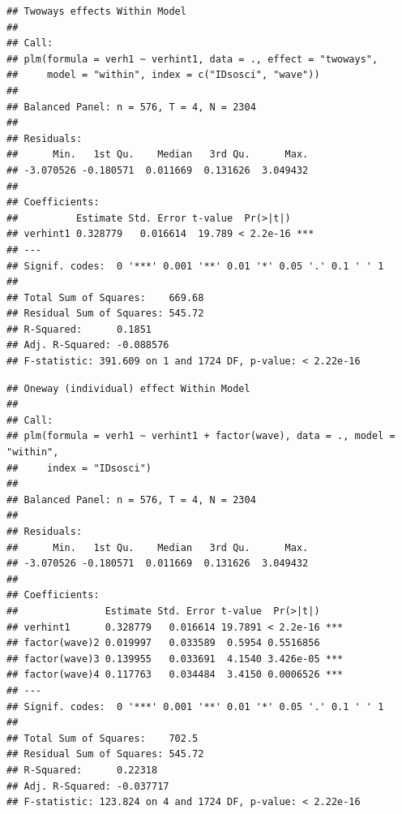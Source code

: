 \documentclass[
]{book}
\newenvironment{Shaded}{\begin{snugshade}}{\end{snugshade}}
\newcommand{\DataTypeTok}[1]{\textcolor[rgb]{0.13,0.29,0.53}{#1}}
\newcommand{\KeywordTok}[1]{\textcolor[rgb]{0.13,0.29,0.53}{\textbf{#1}}}
\newcommand{\NormalTok}[1]{#1}
\newcommand{\OperatorTok}[1]{\textcolor[rgb]{0.81,0.36,0.00}{\textbf{#1}}}
\newcommand{\StringTok}[1]{\textcolor[rgb]{0.31,0.60,0.02}{#1}}
\begin{document}
\begin{verbatim}
## Twoways effects Within Model
## 
## Call:
## plm(formula = verh1 ~ verhint1, data = ., effect = "twoways", 
##     model = "within", index = c("IDsosci", "wave"))
## 
## Balanced Panel: n = 576, T = 4, N = 2304
## 
## Residuals:
##      Min.   1st Qu.    Median   3rd Qu.      Max. 
## -3.070526 -0.180571  0.011669  0.131626  3.049432 
## 
## Coefficients:
##          Estimate Std. Error t-value  Pr(>|t|)    
## verhint1 0.328779   0.016614  19.789 < 2.2e-16 ***
## ---
## Signif. codes:  0 '***' 0.001 '**' 0.01 '*' 0.05 '.' 0.1 ' ' 1
## 
## Total Sum of Squares:    669.68
## Residual Sum of Squares: 545.72
## R-Squared:      0.1851
## Adj. R-Squared: -0.088576
## F-statistic: 391.609 on 1 and 1724 DF, p-value: < 2.22e-16
\end{verbatim}

\begin{Shaded}
\end{Shaded}

\begin{verbatim}
## Oneway (individual) effect Within Model
## 
## Call:
## plm(formula = verh1 ~ verhint1 + factor(wave), data = ., model = "within", 
##     index = "IDsosci")
## 
## Balanced Panel: n = 576, T = 4, N = 2304
## 
## Residuals:
##      Min.   1st Qu.    Median   3rd Qu.      Max. 
## -3.070526 -0.180571  0.011669  0.131626  3.049432 
## 
## Coefficients:
##               Estimate Std. Error t-value  Pr(>|t|)    
## verhint1      0.328779   0.016614 19.7891 < 2.2e-16 ***
## factor(wave)2 0.019997   0.033589  0.5954 0.5516856    
## factor(wave)3 0.139955   0.033691  4.1540 3.426e-05 ***
## factor(wave)4 0.117763   0.034484  3.4150 0.0006526 ***
## ---
## Signif. codes:  0 '***' 0.001 '**' 0.01 '*' 0.05 '.' 0.1 ' ' 1
## 
## Total Sum of Squares:    702.5
## Residual Sum of Squares: 545.72
## R-Squared:      0.22318
## Adj. R-Squared: -0.037717
## F-statistic: 123.824 on 4 and 1724 DF, p-value: < 2.22e-16
\end{verbatim}
\end{document}
